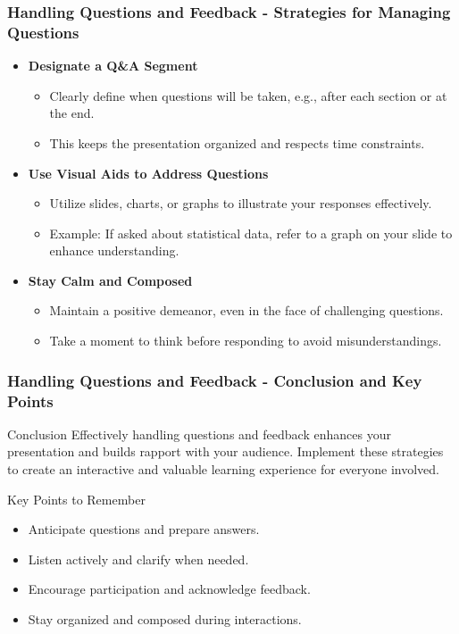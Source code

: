 \documentclass{beamer}
\begin{document}
\begin{frame}[fragile]
    \frametitle{Handling Questions and Feedback - Strategies for Managing Questions}
    \begin{itemize}
        \item \textbf{Designate a Q\&A Segment}
        \begin{itemize}
            \item Clearly define when questions will be taken, e.g., after each section or at the end.
            \item This keeps the presentation organized and respects time constraints.
        \end{itemize}
        
        \item \textbf{Use Visual Aids to Address Questions}
        \begin{itemize}
            \item Utilize slides, charts, or graphs to illustrate your responses effectively.
            \item Example: If asked about statistical data, refer to a graph on your slide to enhance understanding.
        \end{itemize}
        
        \item \textbf{Stay Calm and Composed}
        \begin{itemize}
            \item Maintain a positive demeanor, even in the face of challenging questions.
            \item Take a moment to think before responding to avoid misunderstandings.
        \end{itemize}
    \end{itemize}
\end{frame}

\begin{frame}[fragile]
    \frametitle{Handling Questions and Feedback - Conclusion and Key Points}
    \begin{block}{Conclusion}
        Effectively handling questions and feedback enhances your presentation and builds rapport with your audience. 
        Implement these strategies to create an interactive and valuable learning experience for everyone involved.
    \end{block}
    
    \begin{block}{Key Points to Remember}
        \begin{itemize}
            \item Anticipate questions and prepare answers.
            \item Listen actively and clarify when needed.
            \item Encourage participation and acknowledge feedback.
            \item Stay organized and composed during interactions.
        \end{itemize}
    \end{block}
\end{frame}
\end{document}
